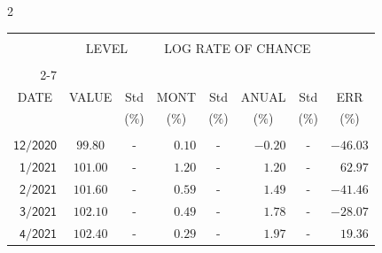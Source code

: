 \begin{multicols}{2}{ 
\begin{tabular}{rccrcrcr} 
\hline 
 \multicolumn{1}{|c|}{}  &  \multicolumn{2}{c|}{} & 
\multicolumn{4}{c}{} & \multicolumn{1}{|c|}{}\vspace{-.10in}\\ 
\multicolumn{1}{|c|}{}  &  \multicolumn{2}{c|}{LEVEL} & 
\multicolumn{4}{c}{LOG RATE OF CHANCE} & \multicolumn{1}{|c|}{}    \\  
\multicolumn{1}{|c|}{}  &  \multicolumn{2}{c|}{} & 
\multicolumn{4}{c}{} & \multicolumn{1}{|c|}{}\vspace{-.10in}\\ \cline{2-7} 
\multicolumn{1}{|c|}{ } &\multicolumn{1}{c|}{ } & \multicolumn{1}{c|}{} & \multicolumn{1}{c|}{} & \multicolumn{1}{c|}{}     & \multicolumn{1}{c|}{} & \multicolumn{1}{c|}{}  & \multicolumn{1}{c|}{}  \vspace{-.05in}\\  
\multicolumn{1}{|c|}{DATE } &\multicolumn{1}{c|}{ VALUE} & \multicolumn{1}{c|}{Std} & \multicolumn{1}{c|}{MONT} & \multicolumn{1}{c|}{Std}     & \multicolumn{1}{c|}{ANUAL} & \multicolumn{1}{c|}{Std}  & \multicolumn{1}{c|}{ERR}\\  
\multicolumn{1}{|c|}{ }      & \multicolumn{1}{c|}{  }    & \multicolumn{1}{c|}{($\%$)}&  \multicolumn{1}{c|}{($\%$)  }  & \multicolumn{1}{c|}{($\%$)} & \multicolumn{1}{c|}{($\%$) }     & \multicolumn{1}{c|}{ ($\%$) }  &  \multicolumn{1}{c|}{ ($\%$) } \\  
 \hline 
 \\$\mathsf{      12/2020}$ &$\mathsf{    99.80}$ &     - &$\mathsf{    0.10}$ &     - &$\mathsf{    -0.20 }$ &     - &$\mathsf{ -46.03} $ \vspace{-.005in}\\ 
$\mathsf{       1/2021}$ &$\mathsf{   101.00}$ &     - &$\mathsf{    1.20}$ &     - &$\mathsf{     1.20 }$ &     - &$\mathsf{  62.97} $ \vspace{-.005in}\\ 
$\mathsf{       2/2021}$ &$\mathsf{   101.60}$ &     - &$\mathsf{    0.59}$ &     - &$\mathsf{     1.49 }$ &     - &$\mathsf{ -41.46} $ \vspace{-.005in}\\ 
$\mathsf{       3/2021}$ &$\mathsf{   102.10}$ &     - &$\mathsf{    0.49}$ &     - &$\mathsf{     1.78 }$ &     - &$\mathsf{ -28.07} $ \vspace{-.005in}\\ 
$\mathsf{       4/2021}$ &$\mathsf{   102.40}$ &     - &$\mathsf{    0.29}$ &     - &$\mathsf{     1.97 }$ &     - &$\mathsf{  19.36} $ \vspace{-.005in}\\ 

\end{tabular}}
\end{multicols}
